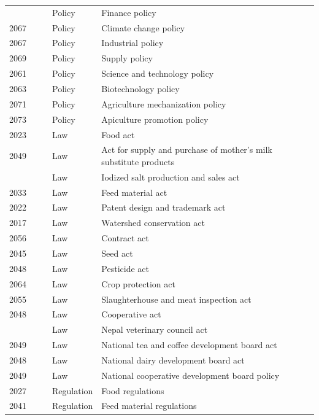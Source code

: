 \documentclass[
  openany]{book}
\begin{document}
\begin{longtable}[t]{rrrl>{\raggedright\arraybackslash}p{16em}}
\addlinespace
2072 &  &  & Policy & Finance policy\\
\rowcolor{gray!6}  2067 &  &  & Policy & Climate change policy\\
2067 &  &  & Policy & Industrial policy\\
\rowcolor{gray!6}  2069 &  &  & Policy & Supply policy\\
2061 &  &  & Policy & Science and technology policy\\
\addlinespace
\rowcolor{gray!6}  2063 &  &  & Policy & Biotechnology policy\\
2071 &  &  & Policy & Agriculture mechanization policy\\
\rowcolor{gray!6}  2073 &  &  & Policy & Apiculture promotion policy\\
2023 &  &  & Law & Food act\\
\rowcolor{gray!6}  2049 &  &  & Law & Act for supply and purchase of mother's milk substitute products\\
\addlinespace
2055 &  &  & Law & Iodized salt production and sales act\\
\rowcolor{gray!6}  2033 &  &  & Law & Feed material act\\
2022 &  &  & Law & Patent design and trademark act\\
\rowcolor{gray!6}  2017 &  &  & Law & Watershed conservation act\\
2056 &  &  & Law & Contract act\\
\addlinespace
\rowcolor{gray!6}  2045 &  &  & Law & Seed act\\
2048 &  &  & Law & Pesticide act\\
\rowcolor{gray!6}  2064 &  &  & Law & Crop protection act\\
2055 &  &  & Law & Slaughterhouse and meat inspection act\\
\rowcolor{gray!6}  2048 &  &  & Law & Cooperative act\\
\addlinespace
2055 &  &  & Law & Nepal veterinary council act\\
\rowcolor{gray!6}  2049 &  &  & Law & National tea and coffee development board act\\
2048 &  &  & Law & National dairy development board act\\
\rowcolor{gray!6}  2049 &  &  & Law & National cooperative development board policy\\
2027 &  &  & Regulation & Food regulations\\
\addlinespace
\rowcolor{gray!6}  2041 &  &  & Regulation & Feed material regulations\\

\end{longtable}
\end{document}
